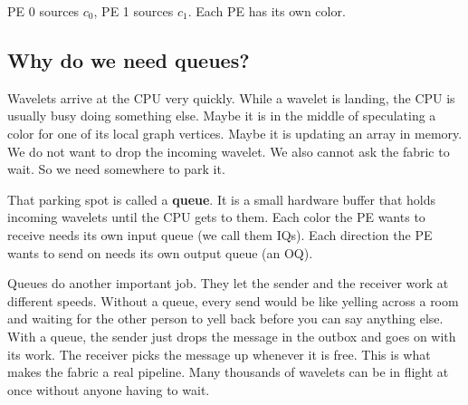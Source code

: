 \documentclass[11pt]{article}
\begin{document}
\vspace{0.4em}

PE 0 sources $c_0$, PE 1 sources $c_1$. Each PE has its own
color.

\begin{center}
\end{center}

\subsection{Why do we need queues?}

Wavelets arrive at the CPU very quickly. While a wavelet is
landing, the CPU is usually busy doing something else. Maybe it
is in the middle of speculating a color for one of its local
graph vertices. Maybe it is updating an array in memory. We do
not want to drop the incoming wavelet. We also cannot ask the
fabric to wait. So we need somewhere to park it.

That parking spot is called a \textbf{queue}. It is a small
hardware buffer that holds incoming wavelets until the CPU gets
to them. Each color the PE wants to receive needs its own input
queue (we call them IQs). Each direction the PE wants to send
on needs its own output queue (an OQ).

Queues do another important job. They let the sender and the
receiver work at different speeds. Without a queue, every send
would be like yelling across a room and waiting for the other
person to yell back before you can say anything else. With a
queue, the sender just drops the message in the outbox and goes
on with its work. The receiver picks the message up whenever it
is free. This is what makes the fabric a real pipeline. Many
thousands of wavelets can be in flight at once without anyone
having to wait.
\end{document}
